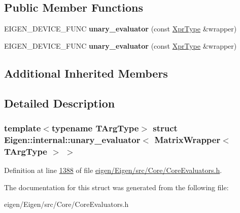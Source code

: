 \subsection*{Public Member Functions}
\begin{DoxyCompactItemize}
\item 
\mbox{\label{struct_eigen_1_1internal_1_1unary__evaluator_3_01_matrix_wrapper_3_01_t_arg_type_01_4_01_4_a435ca48ac98cc82112eab0a2b74a978c}} 
E\+I\+G\+E\+N\+\_\+\+D\+E\+V\+I\+C\+E\+\_\+\+F\+U\+NC {\bfseries unary\+\_\+evaluator} (const \hyperlink{group___core___module_class_eigen_1_1_matrix_wrapper}{Xpr\+Type} \&wrapper)
\item 
\mbox{\label{struct_eigen_1_1internal_1_1unary__evaluator_3_01_matrix_wrapper_3_01_t_arg_type_01_4_01_4_a435ca48ac98cc82112eab0a2b74a978c}} 
E\+I\+G\+E\+N\+\_\+\+D\+E\+V\+I\+C\+E\+\_\+\+F\+U\+NC {\bfseries unary\+\_\+evaluator} (const \hyperlink{group___core___module_class_eigen_1_1_matrix_wrapper}{Xpr\+Type} \&wrapper)
\end{DoxyCompactItemize}
\subsection*{Additional Inherited Members}


\subsection{Detailed Description}
\subsubsection*{template$<$typename T\+Arg\+Type$>$\newline
struct Eigen\+::internal\+::unary\+\_\+evaluator$<$ Matrix\+Wrapper$<$ T\+Arg\+Type $>$ $>$}



Definition at line \hyperlink{eigen_2_eigen_2src_2_core_2_core_evaluators_8h_source_l01388}{1388} of file \hyperlink{eigen_2_eigen_2src_2_core_2_core_evaluators_8h_source}{eigen/\+Eigen/src/\+Core/\+Core\+Evaluators.\+h}.



The documentation for this struct was generated from the following file\+:\begin{DoxyCompactItemize}
\item 
eigen/\+Eigen/src/\+Core/\+Core\+Evaluators.\+h\end{DoxyCompactItemize}
